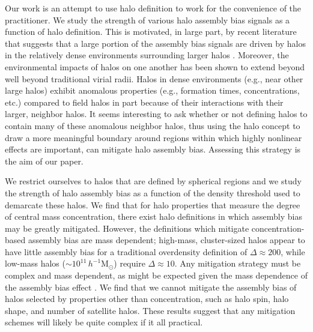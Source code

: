 \documentclass[usenatbib]{mnras}
\begin{document}
Our work is an attempt to use halo definition to work for the 
convenience of the practitioner. We study the strength of various halo assembly bias signals 
as a function of halo definition. This is motivated, in large part, by recent literature that suggests 
that a large portion of the assembly bias signals are driven by halos in the relatively dense environments 
surrounding larger halos \citep{wang_etal07, warnick_etal08, more_etal15,sunayama_etal16}. Moreover, 
the environmental impacts of halos on one another has been shown to extend beyond well beyond 
traditional virial radii. 
\citep{adhikari_etal14, diemer_kravtsov14, wetzel_etal14, more_etal15, wetzel_nagai15} 
Halos in dense environments (e.g., near other large halos) exhibit anomalous properties 
(e.g., formation times, concentrations, etc.) compared to field halos 
in part because of their interactions with their larger, neighbor halos. It seems interesting to ask 
whether or not defining halos to contain many of these anomalous neighbor halos, thus 
using the halo concept to draw a more meaningful boundary around regions within which 
highly nonlinear effects are important, can mitigate halo assembly bias. 
Assessing this strategy is the aim of our paper. 


We restrict ourselves to halos that are defined by spherical regions and we 
study the strength of halo assembly bias as a function of the density threshold used 
to demarcate these halos. We find that for halo properties that measure the degree of 
central mass concentration, there exist halo definitions in which assembly bias may be 
greatly mitigated. However, the definitions which mitigate concentration-based assembly 
bias are mass dependent; high-mass, cluster-sized halos appear to have little assembly bias 
for a traditional overdensity definition of $\Delta \approx 200$, 
while low-mass halos ($\sim 10^{11}\, h^{-1}\mathrm{M}_{\odot}$) require 
$\Delta \approx 10$. Any mitigation strategy must be complex and mass dependent, 
as might be expected given the mass dependence of the assembly bias effect \cite{wechsler_etal06}. 
We find that we cannot mitigate the assembly bias of halos selected by properties 
other than concentration, such as halo spin, halo shape, and number of satellite 
halos. These results suggest that any mitigation schemes will likely be quite complex if it all 
practical. 
\end{document}
